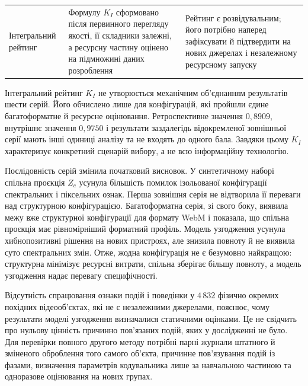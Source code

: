 {\begin{longtable}{@{}p{}p{}p{}@{}}
Інтегральний рейтинг & Формулу $K_I$ сформовано після первинного перегляду якості, її складники залежні, а ресурсну частину оцінено на підмножині даних розроблення & Рейтинг є розвідувальним; його потрібно наперед зафіксувати й підтвердити на нових джерелах і незалежному ресурсному запуску \\
\end{longtable}
}

Інтегральний рейтинг $K_I$ не утворюється механічним об’єднанням результатів шести серій. Його обчислено лише для конфігурацій, які пройшли єдине багатоформатне й ресурсне оцінювання. Ретроспективне значення $0{,}8909$, внутрішнє значення $0{,}9750$ і результати заздалегідь відокремленої зовнішньої серії мають інші одиниці аналізу та не входять до одного бала. Завдяки цьому $K_I$ характеризує конкретний сценарій вибору, а не всю інформаційну технологію.

Послідовність серій змінила початковий висновок. У синтетичному наборі спільна проєкція $Z_c$ усунула більшість помилок ізольованої конфігурації спектральних і піксельних ознак. Перша зовнішня серія не відтворила її переваги над структурною конфігурацією. Багатоформатна серія, зі свого боку, виявила межу вже структурної конфігурації для формату WebM і показала, що спільна проєкція має рівномірніший форматний профіль. Модель узгодження усунула хибнопозитивні рішення на нових пристроях, але знизила повноту й не виявила суто спектральних змін. Отже, жодна конфігурація не є безумовно найкращою: структурна мінімізує ресурсні витрати, спільна зберігає більшу повноту, а модель узгодження надає перевагу специфічності.

Відсутність спрацювання ознаки подій і поведінки у $4\,832$ фізично окремих похідних відеооб’єктах, які не є незалежними джерелами, пояснює, чому результати моделі узгодження визначалися статичними оцінками. Це не свідчить про нульову цінність причинно пов’язаних подій, яких у дослідженні не було. Для перевірки повного другого методу потрібні парні журнали штатного й зміненого оброблення того самого об’єкта, причинне пов’язування подій із фазами, визначення параметрів кодувальника лише за навчальною частиною та одноразове оцінювання на нових групах.

